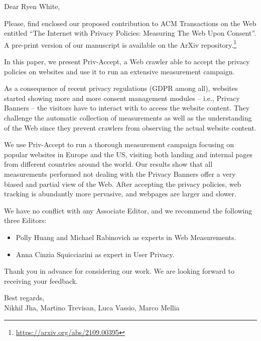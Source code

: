 \documentclass{article}
\begin{document}
\vspace*{2cm}
\noindent
Dear Ryen White, 

\vspace{1cm}
\noindent
Please, find enclosed our proposed contribution to ACM Transactions on the Web entitled ``The Internet with Privacy Policies: Measuring The Web Upon Consent''. A pre-print version of our manuscript is available on the ArXiv repository.\footnote{\url{https://arxiv.org/abs/2109.00395}}

\vspace{0.5cm}
\noindent
In this paper, we present Priv-Accept, a Web crawler able to accept the privacy policies on websites and use it to run an extensive measurement campaign.

\vspace{0.2cm}
\noindent
As a consequence of recent privacy regulations (GDPR among all), websites started showing more and more consent management modules – i.e., Privacy Banners – the visitors have to interact with to access the website content. They challenge the automatic collection of measurements as well as the understanding of the Web since they prevent crawlers from observing the actual website content.

\vspace{0.2cm}
\noindent
We use Priv-Accept to run a thorough measurement campaign focusing on popular websites in Europe and the US, visiting both landing and internal pages from different countries around the world. Our results show that all measurements performed not dealing with the Privacy Banners offer a very biased and partial view of the Web. After accepting the privacy policies, web tracking is abundantly more pervasive, and webpages are larger and slower.

\vspace{0.2cm}
\noindent
We have no conflict with any Associate Editor, and we recommend the following three Editors:
\begin{itemize}
    \item Polly Huang and Michael Rabinovich as experts in Web Measurements.
    \item Anna Cinzia Squicciarini as expert in User Privacy.
\end{itemize}


\vspace{0.5cm}
\noindent
Thank you in advance for considering our work. We are looking forward to receiving your feedback.

\vspace{1cm}
\noindent
Best regards,\\
Nikhil Jha, Martino Trevisan, Luca Vassio, Marco Mellia
\end{document}
